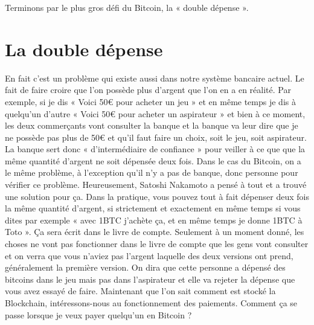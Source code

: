 \documentclass{bredele} %
\begin{document}
    Terminons par le plus gros défi du Bitcoin, la « double dépense ».
    \chapter{La double dépense}
    En fait c’est un problème qui existe aussi dans notre système bancaire actuel. Le fait de faire croire que l’on possède plus d’argent que l’on en a en réalité.
    \newline
    Par exemple, si je dis « Voici 50€ pour acheter un jeu » et en même temps je dis à quelqu’un d’autre « Voici 50€ pour acheter un aspirateur » et bien à ce moment, les deux commerçants vont consulter la banque et la banque va leur dire que je ne possède pas plus de 50€ et qu’il faut faire un choix, soit le jeu, soit aspirateur. La banque sert donc « d’intermédiaire de confiance » pour veiller à ce que que la même quantité d’argent ne soit dépensée deux fois.
    \newline
    \newline
    Dans le cas du Bitcoin, on a le même problème, à l’exception qu’il n’y a pas de banque, donc personne pour vérifier ce problème. Heureusement, Satoshi Nakamoto a pensé à tout et a trouvé une solution pour ça.
    Dans la pratique, vous pouvez tout à fait dépenser deux fois la même quantité d’argent, si strictement et exactement en même temps si vous dites par exemple « avec 1BTC j’achète ça, et en même temps je donne 1BTC à Toto ». Ça sera écrit dans le livre de compte. Seulement à un moment donné, les choses ne vont pas fonctionner dans le livre de compte que les gens vont consulter et on verra que vous n’aviez pas l’argent laquelle des deux versions ont prend, généralement la première version. On dira que cette personne a dépensé des bitcoins dans le jeu mais pas dans l’aspirateur et elle va rejeter la dépense que vous avez essayé de faire.
\newline
    \newline
    Maintenant que l’on sait comment est stocké la Blockchain, intéressons-nous au fonctionnement des paiements. Comment ça se passe lorsque je veux payer quelqu’un en Bitcoin ?
\end{document}
